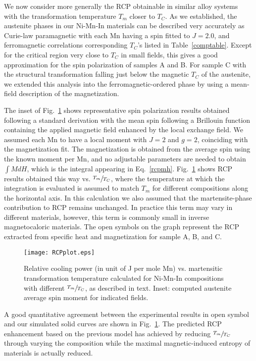 \documentclass[sort&compress,twocolumn,3p]{elsarticle}
\begin{document}
We now consider more generally the RCP obtainable in similar alloy systems with the transformation temperature $T_m$ closer to $T_C$.
As we established, the austenite phases in our Ni-Mn-In materials can be described very accurately as Curie-law paramagnetic with each Mn having a spin fitted to $J=2.0$, and ferromagnetic correlations corresponding $T_C$'s listed in Table~\ref{comptable}.
Except for the critical region very close to $T_C$ in small fields, this gives a good approximation for the spin polarization of samples A and B. For sample C with the structural transformation falling just below the magnetic $T_C$ of the austenite, we extended this analysis into the ferromagnetic-ordered phase by using a mean-field description of the magnetization.

The inset of Fig.~\ref{rcpplot} shows representative spin polarization results obtained following a standard derivation with the mean spin following a Brillouin function containing the applied magnetic field enhanced by the local exchange field\cite{blundell2001magnetism}.
We assumed each Mn to have a local moment with $J=2$ and $g=2$, coinciding with the magnetization fit.
The magnetization is obtained from the average spin using the known moment per Mn, and
no adjustable parameters are needed to obtain $\int MdH$, which is the integral appearing in Eq.~\ref{rcpmh}.
Fig.~\ref{rcpplot} shows RCP results obtained this way vs. $\sfrac{T_m}{T_C}$, where the temperature at which the integration is evaluated is assumed to match $T_m$ for different compositions along the horizontal axis.
In this calculation we also assumed that the martensite-phase contribution to RCP remains unchanged.
In practice this term may vary in different materials, however, this term is commonly small in inverse magnetocaloric materials.
The open symbols on the graph represent the RCP extracted from specific heat and magnetization for sample A, B, and C.
\begin{figure}
\texttt{[image: RCPplot.eps]}
\caption{Relative cooling power (in unit of J per mole Mn) vs. martensitic transformation temperature calculated for Ni-Mn-In compositions with different $\sfrac{T_m}{T_C}$, as described in text.
		Inset: computed austenite average spin moment for indicated fields.}
\label{rcpplot}
\end{figure}

A good quantitative agreement between the experimental results in open symbol and our simulated solid curves are shown in Fig.~\ref{rcpplot}.
The predicted RCP enhancement based on the previous model has achieved by reducing $\sfrac{T_m}{T_C}$ through varying the composition while the maximal magnetic-induced entropy of materials is actually reduced.
\end{document}

